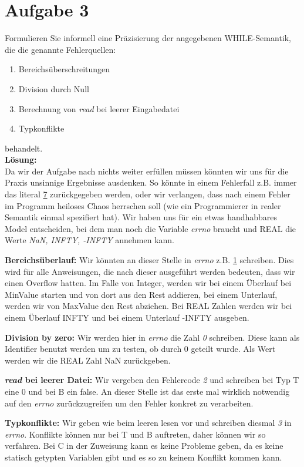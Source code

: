 \documentclass[11pt,a4paper,ngerman]{article}
\begin{document}

\section*{Aufgabe 3}

Formulieren Sie informell eine Präzisierung der angegebenen WHILE-Semantik, die die genannte Fehlerquellen:
\begin{enumerate}
	\item Bereichsüberschreitungen
	\item Division durch Null
	\item Berechnung von \emph{read} bei leerer Eingabedatei
	\item Typkonflikte
\end{enumerate}
behandelt.\\

\textbf{Lösung:}\\
Da wir der Aufgabe nach nichts weiter erfüllen müssen könnten wir uns für die Praxis unsinnige Ergebnisse ausdenken. So könnte in einem Fehlerfall z.B. immer das literal \underline{7} zurückgegeben werden, oder wir verlangen, dass nach einem Fehler im Programm heiloses Chaos herrschen soll (wie ein Programmierer in realer Semantik einmal spezifiert hat). Wir haben uns für ein etwas handhabbares Model entscheiden, bei dem man noch die Variable \emph{errno} braucht und REAL die Werte \emph{NaN, INFTY, -INFTY} annehmen kann.

\begin{description}
	\item{\bfseries Bereichsüberlauf:} Wir könnten an dieser Stelle in \emph{errno} z.B. \underline{1} schreiben. Dies wird für alle Anweisungen, die nach 
		dieser ausgeführt werden bedeuten, dass wir einen Overflow hatten. Im Falle von Integer, werden wir bei einem Überlauf bei MinValue starten
		und von dort aus den Rest addieren, bei einem Unterlauf, werden wir von MaxValue den Rest abziehen. Bei REAL Zahlen werden wir bei einem
		Überlauf INFTY und bei einem Unterlauf -INFTY ausgeben.
	\item{\bfseries Division by zero:} Wir werden hier in \emph{errno} die Zahl \emph{0} schreiben. Diese kann als Identifier benutzt werden um zu testen,
		ob durch 0 geteilt wurde. Als Wert werden wir die REAL Zahl NaN zurückgeben.
	\item{\bfseries \emph{read} bei leerer Datei:} Wir vergeben den Fehlercode \emph{2} und schreiben bei Typ T eine 0 und bei B ein false. An dieser 
		Stelle ist das erste mal wirklich notwendig auf den \emph{errno} zurückzugreifen um den Fehler konkret zu verarbeiten.
	\item{\bfseries Typkonflikte:} Wir geben wie beim leeren lesen vor und schreiben diesmal \emph{3} in \emph{errno}. Konflikte können nur bei T und B 			auftreten, daher können wir so verfahren. Bei C in der Zuweisung kann es keine Probleme geben, da es keine statisch getypten Variablen gibt
		und es so zu keinem Konflikt kommen kann.
\end{description}

\label{LastPage}
\end{document}
